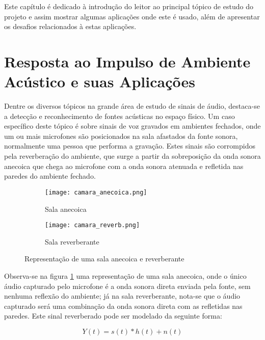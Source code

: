 Este capítulo é dedicado à introdução do leitor ao principal tópico de estudo do projeto e assim mostrar
algumas aplicações onde este é usado, além de apresentar os desafios relacionados à estas aplicações.

\section{Resposta ao Impulso de Ambiente Acústico e suas Aplicações}

Dentre os diversos tópicos na grande área de estudo de sinais de áudio, destaca-se a detecção e reconhecimento de fontes acústicas no espaço físico.
Um caso específico deste tópico é sobre sinais de voz gravados em ambientes fechados, onde um ou mais microfones são posicionados na sala afastados
da fonte sonora, normalmente uma pessoa que performa a gravação.
Estes sinais são corrompidos pela reverberação do ambiente, que surge a partir da sobreposição da onda sonora anecoica que chega ao microfone com a 
onda sonora atenuada e refletida nas paredes do ambiente fechado. 

\begin{figure} [H]
    \begin{subfigure}{.5\textwidth}
        \centering
        \texttt{[image: camara\_anecoica.png]}
        \caption{Sala anecoica}    
    \end{subfigure}
    \begin{subfigure}{.5\textwidth}
        \centering
        \texttt{[image: camara\_reverb.png]}    
        \caption{Sala reverberante}    
    \end{subfigure}
    \caption{Representação de uma sala anecoica e reverberante}
    \label{fig:Rooms}
\end{figure}

Observa-se na figura \ref{fig:Rooms} uma representação de uma sala anecoica, onde o único áudio capturado pelo microfone é a onda sonora direta
enviada pela fonte, sem nenhuma reflexão do ambiente; já na sala reverberante, nota-se que o áudio capturado será uma combinação da onda sonora direta
com as refletidas nas paredes. 
Este sinal reverberado pode ser modelado da seguinte forma:

\begin{equation}
    Y(t) = s(t) \ast h(t) + n(t)
\end{equation}


